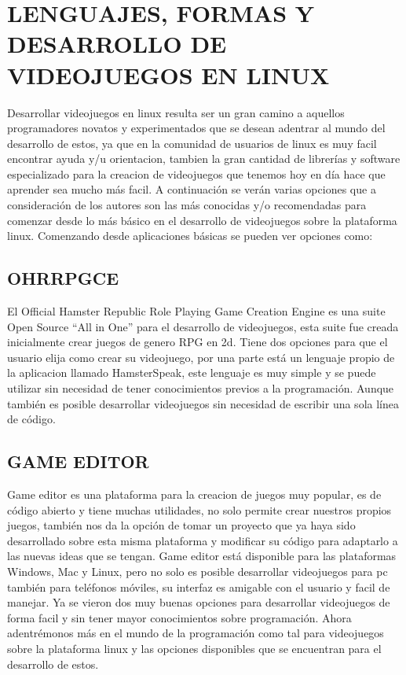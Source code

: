 \section*{LENGUAJES, FORMAS Y DESARROLLO DE VIDEOJUEGOS EN LINUX}

Desarrollar videojuegos en linux resulta ser un gran camino a
aquellos programadores novatos y experimentados que se
desean adentrar al mundo del desarrollo de estos, ya que en la
comunidad de usuarios de linux es muy facil encontrar ayuda y/u
orientacion, tambien la gran cantidad de librerías y software
especializado para la creacion de videojuegos que tenemos hoy
en día hace que aprender sea mucho más facil.
A continuación se verán varias opciones que a consideración de
los autores son las más conocidas y/o recomendadas para
comenzar desde lo más básico en el desarrollo de videojuegos
sobre la plataforma linux.
Comenzando desde aplicaciones básicas se pueden ver opciones
como:

\subsection*{OHRRPGCE}

El Official Hamster Republic Role Playing Game Creation Engine
es una suite Open Source “All in One” para el desarrollo de
videojuegos, esta suite fue creada inicialmente crear juegos de
genero RPG en 2d. Tiene dos opciones para que el usuario elija
como crear su videojuego, por una parte está un lenguaje propio
de la aplicacion llamado HamsterSpeak, este lenguaje es muy
simple y se puede utilizar sin necesidad de tener conocimientos
previos a la programación. Aunque también es posible
desarrollar videojuegos sin necesidad de escribir una sola línea
de código.

\subsection*{GAME EDITOR}

Game editor es una plataforma para la creacion de juegos muy
popular, es de código abierto y tiene muchas utilidades, no solo
permite crear nuestros propios juegos, también nos da la opción
de tomar un proyecto que ya haya sido desarrollado sobre esta
misma plataforma y modificar su código para adaptarlo a las
nuevas ideas que se tengan.
Game editor está disponible para las plataformas Windows, Mac
y Linux, pero no solo es posible desarrollar videojuegos para pc
también para teléfonos móviles, su interfaz es amigable con el
usuario y facil de manejar.
Ya se vieron dos muy buenas opciones para desarrollar
videojuegos de forma facil y sin tener mayor conocimientos
sobre programación. Ahora adentrémonos más en el mundo de
la programación como tal para videojuegos sobre la plataforma
linux y las opciones disponibles que se encuentran para el
desarrollo de estos.


